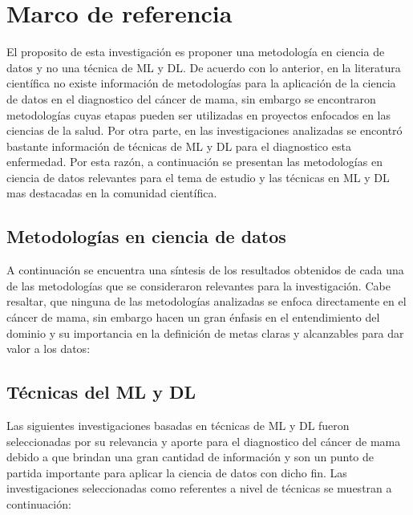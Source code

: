 \newpage
\section{Marco de referencia}
El proposito de esta investigación es proponer una metodología en ciencia de datos y no una técnica de ML y DL. De acuerdo con lo anterior, en la literatura científica no existe información de metodologías para la aplicación de la ciencia de datos en el diagnostico del cáncer de mama, sin embargo se encontraron metodologías cuyas etapas pueden ser utilizadas en proyectos enfocados en las ciencias de la salud. Por otra parte, en las investigaciones analizadas se encontró bastante información de técnicas de ML y DL para el diagnostico esta enfermedad. Por esta razón, a continuación se presentan las metodologías en ciencia de datos relevantes para el tema de estudio y las técnicas en ML y DL mas destacadas en la comunidad científica.  

\subsection{Metodologías en ciencia de datos}
A continuación se encuentra una síntesis de los resultados obtenidos de cada una de las metodologías que se consideraron relevantes para la investigación. Cabe resaltar, que ninguna de las metodologías analizadas se enfoca directamente en el cáncer de mama, sin embargo hacen un gran énfasis en el entendimiento del dominio y su importancia en la definición de metas claras y alcanzables para dar valor a los datos:


\newpage
\subsection{Técnicas del ML y DL}
Las siguientes investigaciones basadas en técnicas de ML y DL fueron seleccionadas por su relevancia y aporte para el diagnostico del cáncer de mama debido a que brindan una gran cantidad de información y son un punto de partida importante para aplicar la ciencia de datos con dicho fin. Las investigaciones seleccionadas como referentes a nivel de técnicas se muestran a continuación:

